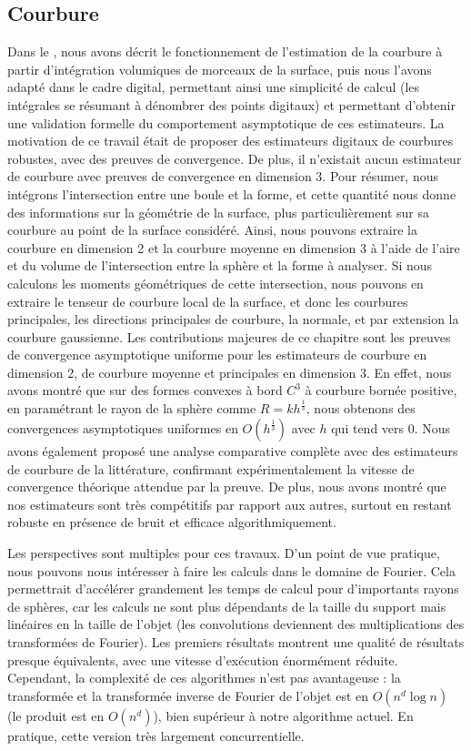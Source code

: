 \subsection*{Courbure}
%
Dans le , nous avons décrit le fonctionnement de
l'estimation de la courbure à partir d'intégration volumiques de morceaux de la
surface, puis nous l'avons adapté dans le cadre digital, permettant ainsi une
simplicité de calcul (les intégrales se résumant à dénombrer des points
digitaux) et permettant d'obtenir une validation formelle du comportement
asymptotique de ces estimateurs. La motivation de ce travail était
de proposer des estimateurs digitaux de courbures robustes, avec des preuves de
convergence. De plus, il n'existait aucun estimateur de courbure avec preuves de
convergence en dimension 3.
%
Pour résumer, nous intégrons l'intersection entre une boule et la forme, et
cette quantité nous donne des informations sur la géométrie de la surface, plus
particulièrement sur sa courbure au point de la surface considéré. Ainsi, nous
pouvons extraire la courbure en dimension 2 et la courbure moyenne en dimension
3 à l'aide de l'aire et du volume de l'intersection entre la sphère et la
forme à analyser. Si nous calculons les moments géométriques de cette
intersection, nous pouvons en extraire le tenseur de courbure local de la
surface, et donc les courbures principales, les directions principales de
courbure, la normale, et par extension la courbure gaussienne.
%
Les contributions majeures de ce chapitre sont les preuves de convergence
asymptotique uniforme pour les estimateurs de courbure en dimension 2, de
courbure moyenne et principales en dimension 3. En effet, nous avons montré que
sur des formes convexes à bord $C^3$ à courbure bornée positive, en
paramétrant le rayon de la sphère comme $R = kh^\frac{1}{3}$, nous obtenons des
convergences asymptotiques uniformes en $O(h^\frac{1}{3})$ avec $h$ qui tend
vers $0$.
%
Nous avons également proposé une analyse comparative complète avec des
estimateurs de courbure de la littérature, confirmant expérimentalement la
vitesse de convergence théorique attendue par la preuve. De plus, nous avons
montré que nos estimateurs sont très compétitifs par rapport aux autres, surtout
en restant robuste en présence de bruit et efficace algorithmiquement.


Les perspectives sont multiples pour ces travaux. D'un point de vue pratique,
nous pouvons nous intéresser à faire les calculs dans le domaine de Fourier.
Cela permettrait d’accélérer grandement les temps de calcul pour d'importants rayons
de sphères, car les calculs ne sont plus dépendants de la taille du support mais
linéaires en la taille de l'objet (les convolutions deviennent des
multiplications des transformées de Fourier). Les premiers résultats montrent
une qualité de résultats presque équivalents, avec une vitesse d'exécution
énormément réduite. Cependant, la complexité de ces algorithmes n'est pas
avantageuse : la transformée et la transformée inverse de Fourier de l'objet est
en $O(n^d \log n)$ (le produit est en $O(n^d)$), bien supérieur à notre
algorithme actuel. En pratique, cette version très largement concurrentielle.

